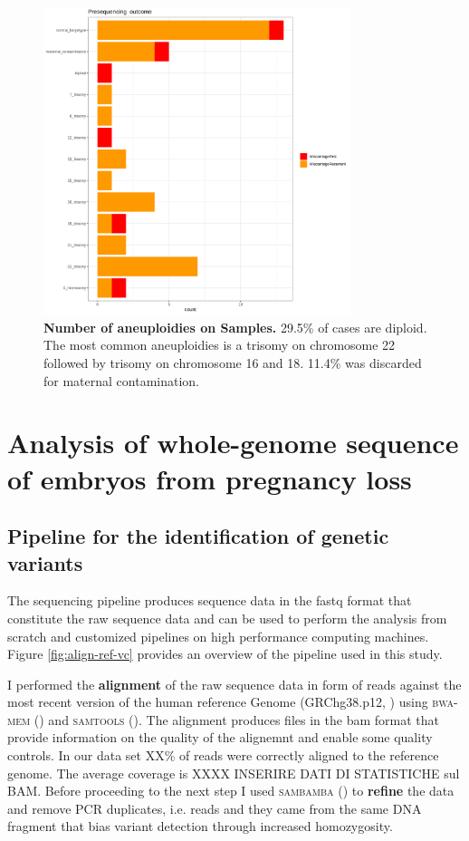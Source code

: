 \documentclass[
tikz,
11pt, %
oneside, %
english, %
singlespacing, %
headsepline, %
]{MastersDoctoralThesisV2} %
\begin{document}
\begin{figure}[H]
\centering
\includegraphics[width=0.8\textwidth]{fig/preseqOutcome.png}
\decoRule
\caption{\textbf{Number of aneuploidies on Samples.} 29.5\% of cases are diploid. The most common aneuploidies is a trisomy on chromosome 22 followed by trisomy on chromosome 16 and 18. 11.4\% was discarded for maternal contamination.}
\label{fig:preseqOutcome}
\end{figure}



\section{Analysis of whole-genome sequence of embryos from pregnancy loss}
\subsection{Pipeline for the identification of genetic variants}
The sequencing pipeline produces sequence data in the \gls{fastq} format that constitute the raw sequence data and can be used to perform the analysis from scratch and customized pipelines on \gls{high performance computing} machines. Figure \ref{fig:align-ref-vc} provides an overview of the pipeline used in this study.

I performed the \textbf{alignment} of the raw sequence data in form of \gls{reads} against the most recent version of the human reference Genome (GRChg38.p12, \cite{rosenbloom2015ucsc}) using \textsc{bwa-mem} (\cite{li2013aligning}) and \textsc{samtools} (\cite{li2009sequence}). The alignment produces files in the \gls{bam} format that provide information on the quality of the alignemnt and enable some quality controls. In our data set XX\% of reads were correctly aligned to the reference genome. The average \gls{coverage} is XXXX INSERIRE DATI DI STATISTICHE sul BAM.   
Before proceeding to the next step I used \textsc{sambamba} (\cite{tarasov2015sambamba}) to \textbf{refine} the data and remove PCR duplicates, i.e. reads and they came from the same DNA fragment that bias variant detection through increased homozygosity.
\end{document}
